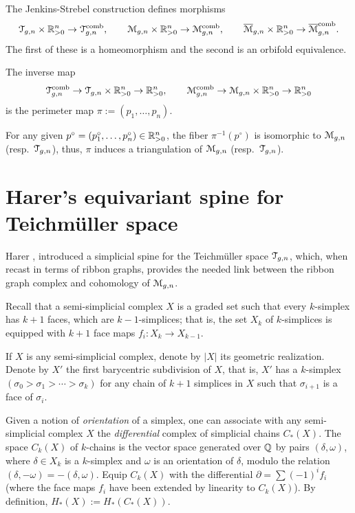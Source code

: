\begin{theorem} 
  The Jenkins-Strebel construction defines morphisms
  \begin{equation*}
    \mathcal{T}_{g,n} \times \mathbb{R}_{>0}^n \to \mathcal{T}\sp{\text{comb}}_{g,n}, 
    \qquad
    \mathcal{M}_{g,n} \times \mathbb{R}_{>0}^n \to \mathcal{M}\sp{\text{comb}}_{g,n}, 
    \qquad 
    \overline{\mathcal{M}}_{g,n} \times \mathbb{R}_{>0}^n \to \overline{\mathcal{M}}\sp{\text{comb}}_{g,n}.
  \end{equation*}
  The first of these is a homeomorphism and the second is an orbifold
  equivalence. 

  The inverse map
  \begin{equation*}
    \mathcal{T}\sp{\text{comb}}_{g,n} \to \mathcal{T}_{g,n} \times \mathbb{R}_{>0}^n \to \mathbb{R}_{>0}^n,
    \qquad
    \mathcal{M}\sp{\text{comb}}_{g,n} \to \mathcal{M}_{g,n} \times \mathbb{R}_{>0}^n \to \mathbb{R}_{>0}^n
  \end{equation*}
  is the perimeter map $\pi := (p_1, \ldots, p_n)$.  
\end{theorem}

For any given $p^\circ = (p_1^\circ, \ldots, p_n^\circ) \in \mathbb{R}_{>0}^n$, the fiber
$\pi^{-1}(p^\circ)$ is isomorphic to $\mathcal{M}_{g,n}$ (resp.\ $\mathcal{T}_{g,n}$), thus,
$\pi$ induces a triangulation of $\mathcal{M}_{g,n}$ (resp.\ $\mathcal{T}_{g,n}$).



\section{Harer's equivariant spine for Teichm\"uller space}
\label{sec:spine}

Harer \cite{harer;cohomological-dimension}, introduced a simplicial
spine for the Teichm\"uller space $\mathcal{T}_{g,n}$, which, when recast in
terms of ribbon graphs, provides the needed link between the ribbon
graph complex and cohomology of $\mathcal{M}_{g,n}$.

Recall that a semi-simplicial complex $X$ is a graded set such that
every $k$-simplex has $k+1$ faces, which are $k-1$-simplices; that is,
the set $X_k$ of $k$-simplices is equipped with $k+1$ face maps
$f_i:X_k \to X_{k-1}$.

If $X$ is any semi-simplicial complex, denote by $|X|$ its geometric
realization.  Denote by $X'$ the first barycentric subdivision of $X$,
that is, $X'$ has a $k$-simplex $(\sigma_0 > \sigma_1 > \cdots > \sigma_k)$ for any chain
of $k+1$ simplices in $X$ such that $\sigma_{i+1}$ is a face of $\sigma_i$.

Given a notion of \emph{orientation} of a simplex, one can associate
with any semi-simplicial complex $X$ the \emph{differential} complex
of simplicial chains $C_*(X)$.  The space $C_k(X)$ of $k$-chains is
the vector space generated over $\mathbb{Q}$ by pairs $(\delta, \omega)$, where $\delta \in X_k$
is a $k$-simplex and $\omega$ is an orientation of $\delta$, modulo the relation
$(\delta, -\omega) = -(\delta, \omega)$.  Equip $C_k(X)$ with the differential $\partial = \sum
(-1)^if_i$ (where the face maps $f_i$ have been extended by linearity
to $C_k(X)$).  By definition, $H_*(X) := H_*(C_*(X))$.


